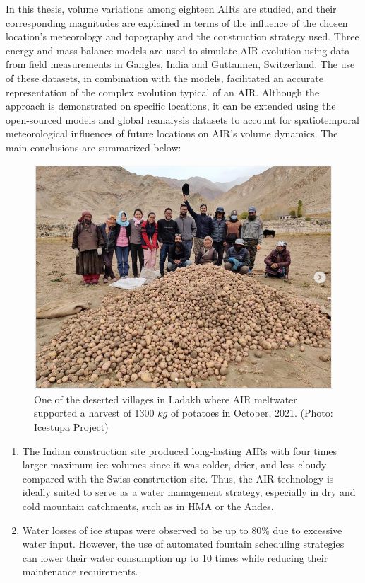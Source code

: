 In this thesis, volume variations among eighteen \ac{AIRs} are studied, and their corresponding magnitudes
are explained in terms of the influence of the chosen location's meteorology and topography and the construction
strategy used. Three energy and mass balance models are used to simulate \ac{AIR} evolution using data from field
measurements in Gangles, India and Guttannen, Switzerland. The use of these datasets, in combination with the
models, facilitated an accurate representation of the complex evolution typical of an \ac{AIR}. Although the
approach is demonstrated on specific locations, it can be extended using the open-sourced models and global
reanalysis datasets to account for spatiotemporal meteorological influences of future locations on \ac{AIR}'s
volume dynamics. The main conclusions are summarized below:

\begin{figure}[htb]
  \centering
	\includegraphics[width=8 cm]{figs/Kullum_potatoes}
	\caption{One of the deserted villages in Ladakh where \ac{AIR} meltwater supported a harvest of 1300 $kg$ of
		potatoes in October, 2021. (Photo: Icestupa Project)}
	\label{fig:kullum_potatoes}
\end{figure}

\begin{enumerate}

  \item The Indian construction site produced long-lasting \ac{AIRs} with four times larger maximum ice volumes
    since it was colder, drier, and less cloudy compared with the Swiss construction site. Thus, the \ac{AIR}
    technology is ideally suited to serve as a water management strategy, especially in dry and cold mountain
    catchments, such as in \ac{HMA} or the Andes.

  \item Water losses of ice stupas were observed to be up to 80\% due to excessive water input. However, the use
    of automated fountain scheduling strategies can lower their water consumption up to 10 times while reducing
    their maintenance requirements.

\end{enumerate}

